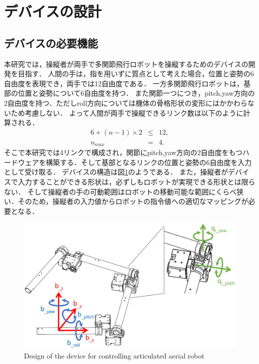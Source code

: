 \documentclass{jarticle}
\begin{document}

\section{デバイスの設計}
\subsection{デバイスの必要機能}
本研究では，操縦者が両手で多関節飛行ロボットを操縦するためのデバイスの開発を目指す．
人間の手は，指を用いずに質点として考えた場合，位置と姿勢の6自由度を表現でき，両手では12自由度である．
一方多関節飛行ロボットは，基部の位置と姿勢について6自由度を持つ．
また関節一つにつき，pitch,yaw方向の2自由度を持つ．ただしroll方向については機体の骨格形状の変形にはかかわらないため考慮しない．
よって人間が両手で操縦できるリンク数は以下のように計算される．
\begin{eqnarray}
    6 + (n-1) \times 2 &\leq& 12 ,\\
    n_{max} &=& 4 .
\end{eqnarray}
そこで本研究では4リンクで構成され，関節にpitch,yaw方向の2自由度をもつハードウェアを構築する．そして基部となるリンクの位置と姿勢の6自由度を入力として受け取る．
デバイスの構造は図\ref{fig:avatar_image}のようである．
また，操縦者がデバイスで入力することができる形状は，必ずしもロボットが実現できる形状とは限らない．
そして操縦者の手の可動範囲はロボットの移動可能な範囲にくらべ狭い．そのため，操縦者の入力値からロボットの指令値への適切なマッピングが必要となる．
\begin{figure}[tb]
    \centering
    \includegraphics[width=0.6\columnwidth]{figs/device_concept.eps}
    \caption{Design of the device for controlling articulated aerial robot}
    \label{fig:avatar_image}
\end{figure}
\end{document}
